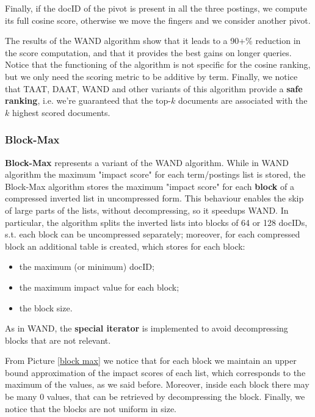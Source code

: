 Finally, if the docID of the pivot is present in all the three postings, we compute its full cosine score, otherwise we move the fingers and we consider another pivot.

The results of the WAND algorithm show that it leads to a 90+\% reduction in the score computation, and that it provides the best gains on longer queries. Notice that the functioning of the algorithm is not specific for the cosine ranking, but we only need the scoring metric to be additive by term. Finally, we notice that TAAT, DAAT, WAND and other variants of this algorithm provide a \textbf{safe ranking}, i.e. we're guaranteed that the top-$k$ documents are associated with the $k$ highest scored documents.

\subsubsection{Block-Max}
\textbf{Block-Max} represents a variant of the WAND algorithm. While in WAND algorithm the maximum "impact score" for each term/postings list is stored, the Block-Max algorithm stores the maximum "impact score" for each \textbf{block} of a compressed inverted list in uncompressed form. This behaviour enables the skip of large parts of the lists, without decompressing, so it speedups WAND. In particular, the algorithm splits the inverted lists into blocks of 64 or 128 docIDs, s.t. each block can be uncompressed separately; moreover, for each compressed block an additional table is created, which stores for each block:

\begin{itemize}
    \item the maximum (or minimum) docID;
    \item the maximum impact value for each block;
    \item the block size.
\end{itemize}

As in WAND, the \textbf{special iterator} is implemented to avoid decompressing blocks that are not relevant.

From Picture \ref{block max} we notice that for each block we maintain an upper bound approximation of the impact scores of each list, which corresponds to the maximum of the values, as we said before. Moreover, inside each block there may be many 0 values, that can be retrieved by decompressing the block. Finally, we notice that the blocks are not uniform in size.

